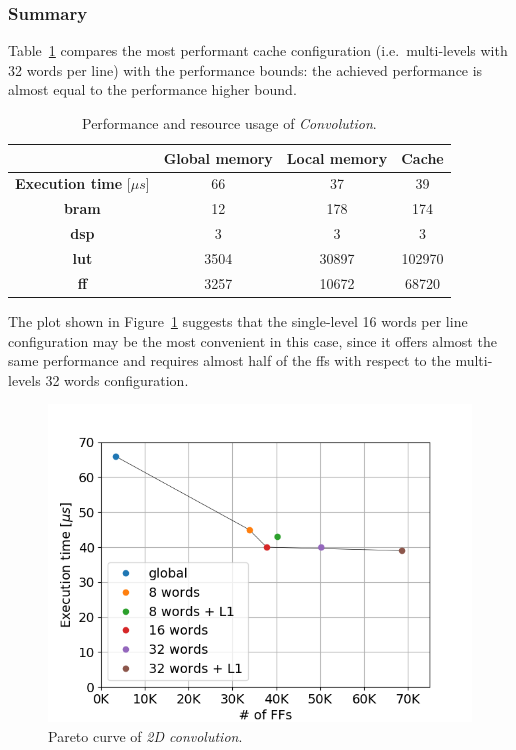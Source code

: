 \documentclass[11pt,a4paper,oneside]{memoir}
\begin{document}
\subsubsection{Summary}
Table~\ref{tab:conv_report} compares the most performant cache configuration
(i.e.\ multi-levels with 32 words per line) with the performance bounds: the
achieved performance is almost equal to the performance higher bound.

\begin{table}[H]
	\begin{center}
		\begin{tabular}{cccc}
			\hline
			\rowcolor{gray!50}
			& \textbf{Global memory} & \textbf{Local memory} &
			\textbf{Cache} \\
			\hline
			\textbf{Execution time} [$\mu s$] & 66 & 37 & 39 \\
			\rowcolor{gray!25}
			\textbf{\ac{bram}} & 12 & 178 & 174 \\
			\textbf{\acs{dsp}} & 3 & 3 & 3 \\
			\rowcolor{gray!25}
			\textbf{\acs{lut}} & 3504 & 30897 & 102970 \\
			\textbf{\acs{ff}} & 3257 & 10672 & 68720 \\
			\hline
		\end{tabular}
	\end{center}
	\caption{Performance and resource usage of \emph{Convolution}.}
	\label{tab:conv_report}
\end{table}

The plot shown in Figure~\ref{fig:conv_design_space} suggests that the
single-level 16 words per line configuration may be the most convenient in this
case, since it offers almost the same performance and requires almost half of
the \acp{ff} with respect to the multi-levels 32 words configuration.

\begin{figure}[H]
	\centering
	\includegraphics[width=.8\textwidth]{conv_design_space}
	\caption{Pareto curve of \emph{2D convolution}.}
	\label{fig:conv_design_space}
\end{figure}
\end{document}
